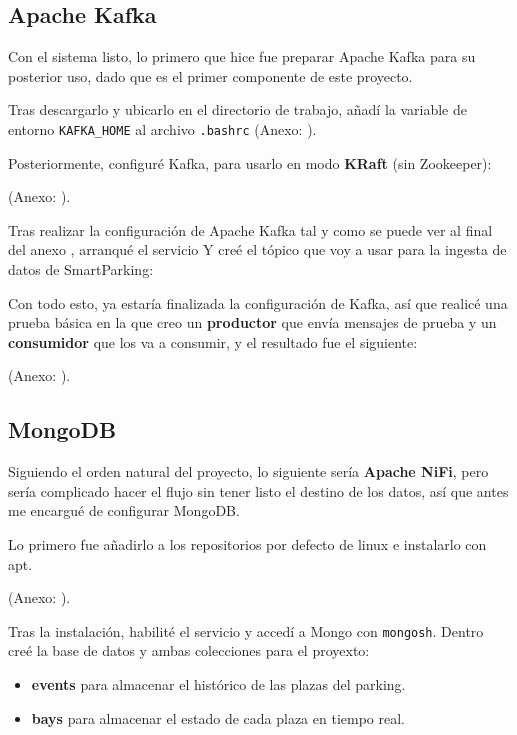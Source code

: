 \documentclass{../../../miPlantilla}
\begin{document}
\newpage

\subsection{Apache Kafka}
Con el sistema listo, lo primero que hice fue preparar Apache Kafka para su posterior uso, dado que es el primer componente de este proyecto.

Tras descargarlo y ubicarlo en el directorio de trabajo, añadí la variable de entorno \texttt{KAFKA\_HOME} al archivo \texttt{.bashrc} {\small(Anexo: )}.

Posteriormente, configuré Kafka, para usarlo en modo \textbf{KRaft} (sin Zookeeper):
\begin{center}
  {\small(Anexo: )}.
\end{center}

Tras realizar la configuración de Apache Kafka tal y como se puede ver al final del anexo , arranqué el servicio Y
creé el tópico que voy a usar para la ingesta de datos de SmartParking:

Con todo esto, ya estaría finalizada la configuración de Kafka, así que realicé una prueba básica en la que creo un \textbf{productor}
que envía mensajes de prueba y un \textbf{consumidor} que los va a consumir, y el resultado fue el siguiente:
\begin{center}
  {\small(Anexo: )}.
\end{center}

\newpage

\subsection{MongoDB}
Siguiendo el orden natural del proyecto, lo siguiente sería \textbf{Apache NiFi}, pero sería complicado hacer el flujo sin tener listo el destino de los datos,
así que antes me encargué de configurar MongoDB.

Lo primero fue añadirlo a los repositorios por defecto de linux e instalarlo con apt.
\begin{center}
  {\small(Anexo: )}.
\end{center}

Tras la instalación, habilité el servicio y accedí a Mongo con \texttt{mongosh}. Dentro creé la base de datos y ambas colecciones para el proyexto:
\begin{itemize}
  \item \textbf{events} para almacenar el histórico de las plazas del parking.
  \item \textbf{bays} para almacenar el estado de cada plaza en tiempo real.
\end{itemize}
\end{document}

